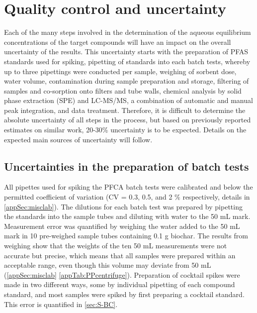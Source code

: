 \section{Quality control and uncertainty}
Each of the many steps involved in the determination of the aqueous equilibrium concentrations of the target compounds will have an impact on the overall uncertainty of the results. This uncertainty starts with the preparation of PFAS standards used for spiking, pipetting of standards into each batch tests, whereby up to three pipettings were conducted per sample, weighing of sorbent dose, water volume, contamination during sample preparation and storage, filtering of samples and co-sorption onto filters and tube walls, chemical analysis by solid phase extraction (SPE) and LC-MS/MS, a combination of automatic and manual peak integration, and data treatment. Therefore, it is difficult to determine the absolute uncertainty of all steps in the process, but based on previously reported estimates on similar work, 20-30\% uncertainty is to be expected. Details on the expected main sources of uncertainty will follow.

\subsection{Uncertainties in the preparation of batch tests}
All pipettes used for spiking the PFCA batch tests were calibrated and below the permitted coefficient of variation (CV = 0.3, 0.5, and 2 $\%$ respectively, details in \cref{appSec:misclab}). The dilutions for each batch test was prepared by pipetting the standards into the sample tubes and diluting with water to the 50 mL mark. Measurement error was quantified by weighing the water added to the 50 mL mark in 10 pre-weighed sample tubes containing 0.1 g biochar. The results from weighing show that the weights of the ten 50 mL measurements were not accurate but precise, which means that all samples were prepared within an acceptable range, even though this volume may deviate from 50 mL (\cref{appSec:misclab} \cref{appTab:PPcentrifuge}). Preparation of cocktail spikes were made in two different ways, some by individual pipetting of each compound standard, and most samples were spiked by first preparing a cocktail standard. This error is quantified in \cref{sec:S-BC}. 

